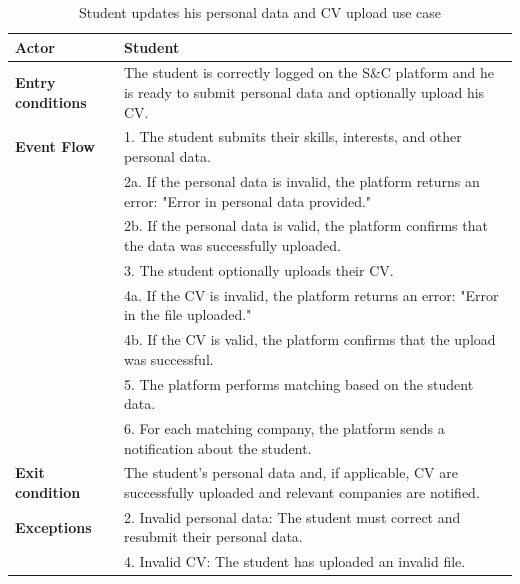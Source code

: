 \begin{table}[h!]
    \centering
    \begin{tabular}{lp{10cm}}
        \textbf{Actor} & Student \\ \hline
        \textbf{Entry conditions} & The student is correctly logged on the S\&C platform and he is ready to submit personal data and optionally upload his CV. \\ \hline
        \textbf{Event Flow} &
        1. The student submits their skills, interests, and other personal data. \\
        & 2a. If the personal data is invalid, the platform returns an error: "Error in personal data provided." \\
        & 2b. If the personal data is valid, the platform confirms that the data was successfully uploaded. \\
        & 3. The student optionally uploads their CV. \\
        & 4a. If the CV is invalid, the platform returns an error: "Error in the file uploaded." \\
        & 4b. If the CV is valid, the platform confirms that the upload was successful. \\
        & 5. The platform performs matching based on the student data. \\
        & 6. For each matching company, the platform sends a notification about the student. \\
        \hline
        \textbf{Exit condition} & The student's personal data and, if applicable, CV are successfully uploaded and relevant companies are notified. \\ \hline
        \textbf{Exceptions} &
        2. Invalid personal data: The student must correct and resubmit their personal data. \\
        & 4. Invalid CV: The student has uploaded an invalid file. \\
    \end{tabular}
    \caption{Student updates his personal data and CV upload use case}
    \label{tab:student_data_cv_upload}
\end{table}



